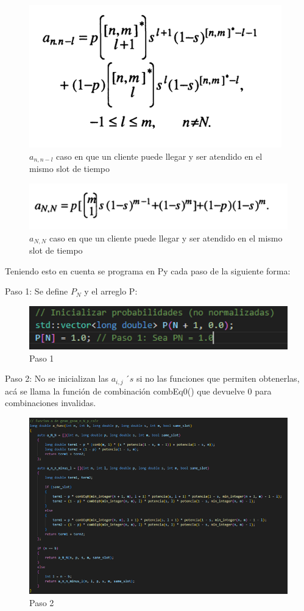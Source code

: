\documentclass{article}
\begin{document}
\begin{figure}[H]
    \centering
    \includegraphics[width=0.5\linewidth]{images/imageGeoGeoMCalc3.png}
    \caption{$a_{n,n-l}$ caso en que un cliente puede llegar y ser atendido en el mismo slot de tiempo}
    \label{fig:enter-label}
\end{figure}

\begin{figure}[H]
    \centering
    \includegraphics[width=0.5\linewidth]{images/imageGeoGeoMCalc4.png}
    \caption{$a_{N,N}$ caso en que un cliente puede llegar y ser atendido en el mismo slot de tiempo}
    \label{fig:enter-label}
\end{figure}

Teniendo esto en cuenta se programa en Py cada paso de la siguiente forma:

Paso 1: Se define $P_N$ y el arreglo P:
\begin{figure}[H]
    \centering
    \includegraphics[width=0.5\linewidth]{images/imageGeoGeoMCalc5.png}
    \caption{Paso 1}
    \label{fig:enter-label}
\end{figure}

Paso 2: No se inicializan las $a_{i,j}\ ´s$ si no las funciones que permiten obtenerlas, acá se llama la función de combinación combEq0() que devuelve 0 para combinaciones invalidas.
\begin{figure}[H]
    \centering
    \includegraphics[width=0.75\linewidth]{images/imageGeoGeoMCalc6.png}
    \caption{Paso 2}
    \label{fig:enter-label}
\end{figure}
\end{document}
